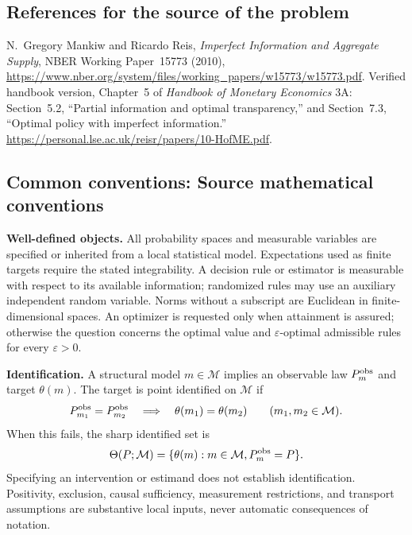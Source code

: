 \documentclass[11pt,a4paper]{article}
\begin{document}
\subsection*{References for the source of the problem}
N.~Gregory Mankiw and Ricardo Reis, \emph{Imperfect Information and Aggregate Supply}, NBER Working Paper~15773 (2010), \url{https://www.nber.org/system/files/working_papers/w15773/w15773.pdf}. Verified handbook version, Chapter~5 of \emph{Handbook of Monetary Economics} 3A: Section~5.2, ``Partial information and optimal transparency,'' and Section~7.3, ``Optimal policy with imperfect information.'' \url{https://personal.lse.ac.uk/reisr/papers/10-HofME.pdf}.

\subsection*{Common conventions: Source mathematical conventions}

\textbf{Well-defined objects.}
All probability spaces and measurable variables are specified or inherited
from a local statistical model. Expectations used as finite targets require
the stated integrability. A decision rule or estimator is measurable with
respect to its available information; randomized rules may use an auxiliary
independent random variable. Norms without a subscript are Euclidean in
finite-dimensional spaces. An optimizer is requested only when attainment
is assured; otherwise the question concerns the optimal value and
$\varepsilon$-optimal admissible rules for every $\varepsilon>0$.

\textbf{Identification.}
A structural model $m\in\mathcal M$ implies an observable law
$P_m^{\rm obs}$ and target $\theta(m)$. The target is point identified on
$\mathcal M$ if
\[
 P_{m_1}^{\rm obs}=P_{m_2}^{\rm obs}
 \quad\Longrightarrow\quad\theta(m_1)=\theta(m_2)
 \qquad(m_1,m_2\in\mathcal M).
\]
When this fails, the sharp identified set is
\[
 \Theta(P;\mathcal M)=\{\theta(m):m\in\mathcal M,
                                  P_m^{\rm obs}=P\}.
\]
Specifying an intervention or estimand does not establish identification.
Positivity, exclusion, causal sufficiency, measurement restrictions, and
transport assumptions are substantive local inputs, never automatic
consequences of notation.
\end{document}
